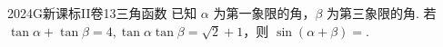 
\begin{problem}{2024}{G}{新课标II卷}{13}{三角函数}
已知 $\alpha$ 为第一象限的角，$\beta$ 为第三象限的角. 若 $\tan\alpha+\tan\beta=4, \tan\alpha\tan\beta=\sqrt{2}+1$，则 $\sin(\alpha+\beta)=$\underline{\hspace{4em}}.
\end{problem}